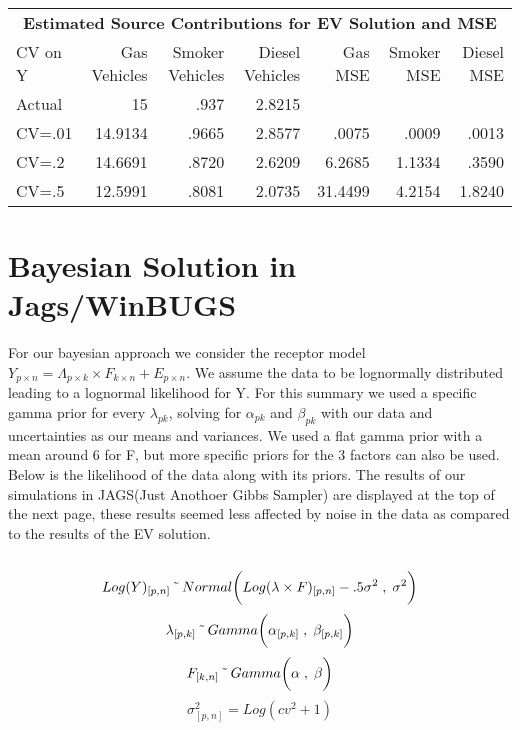 \documentclass{report}
\begin{document}
\begin{center}
\begin{tabular}{l | r | r | r|  r |  r | r }
\multicolumn{7}{c}{\textbf{Estimated Source Contributions for EV Solution and MSE}}\\
CV on Y & Gas Vehicles & Smoker Vehicles & Diesel Vehicles & Gas MSE & Smoker MSE & Diesel MSE\\ \hline
Actual                      & 15 & .937 & 2.8215 &  &  &  \\ 
CV=.01                    & 14.9134 & .9665 & 2.8577 & .0075 & .0009 & .0013\\
CV=.2                      & 14.6691 & .8720  & 2.6209 & 6.2685 & 1.1334 &  .3590\\
CV=.5                      & 12.5991 & .8081 & 2.0735 & 31.4499 & 4.2154 & 1.8240\\
\end{tabular}
\end{center}

\section*{Bayesian Solution in Jags/WinBUGS}
For our bayesian approach we consider the receptor model $Y_{p\times n} = \Lambda_{p\times k} \times F_{k\times n} + E_{p\times n}$.  We assume the data to be lognormally distributed leading to a lognormal likelihood for Y.  For this summary we used a specific gamma prior for every $\lambda_{pk}$, solving for $\alpha_{pk}$ and $\beta_{pk}$ with our data and uncertainties as our means and variances.  We used a flat gamma prior with a mean around 6 for F, but more specific priors for the 3 factors can also be used.  Below is the likelihood of the data  along with its priors.  The results of our simulations in JAGS(Just Anothoer Gibbs Sampler) are displayed at the top of the next page, these results seemed less affected by noise in the data as compared to the results of the EV solution.
 \\ \\
\[Log(Y)_{[p,n]} \, \char`\~ \,  Normal\bigg(Log(\lambda \times F)_{[p,n]}-.5\sigma^2 \;,\; \sigma^2\bigg)\]
\[\lambda_{[p,k]} \, \char`\~ \, Gamma\bigg(\alpha_{[p,k]}\;,\; \beta_{[p,k]}\bigg)\]
\[F_{[k,n]} \, \char`\~ \, Gamma\bigg(\alpha\;,\; \beta\bigg)\]
\[\sigma^2_{[p,n]}=Log(cv^2+1)\]
\end{document}
